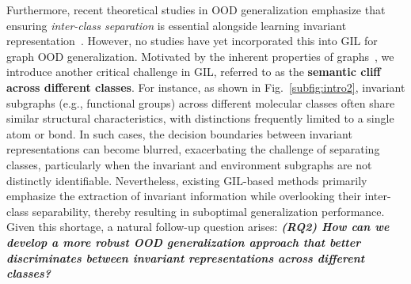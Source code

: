 {Furthermore, recent theoretical studies in OOD generalization emphasize that ensuring \textit{inter-class separation} is essential alongside learning invariant representation~\citep{ye2021towards,bai2024hypo}. However, no studies have yet incorporated this into GIL for graph OOD generalization. Motivated by the inherent properties of graphs~\citep{xia2024understanding}, we introduce another critical challenge in GIL, referred to as the \textbf{semantic cliff across different classes}.}
For instance, as shown in Fig.~\ref{subfig:intro2}, invariant subgraphs (e.g., functional groups) across different molecular classes often share similar structural characteristics, with distinctions frequently limited to a single atom or bond. In such cases, the decision boundaries between invariant representations can become blurred, exacerbating the challenge of separating classes, particularly when the invariant and environment subgraphs are not distinctly identifiable. Nevertheless, existing GIL-based methods primarily emphasize the extraction of invariant information while overlooking their inter-class separability, thereby resulting in suboptimal generalization performance. Given this shortage, a natural follow-up question arises: \textbf{\textit{(RQ2) How can we develop a more robust OOD generalization approach that better discriminates between invariant representations across different classes?}}

